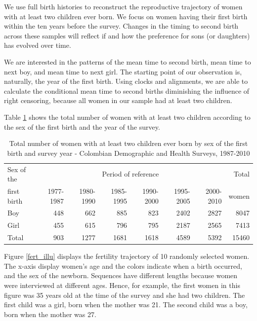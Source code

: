 \documentclass{article}
\begin{document}
We use full birth histories to reconstruct the reproductive trajectory of women with at least two children ever born. We focus on women having their first birth within the ten years before the survey. Changes in the timing to second birth across these samples will reflect if and how the preference for sons (or daughters) has evolved over time.

We are interested in the patterns of the mean time to second birth, mean time to next boy, and mean time to next girl. The starting point of our observation is, naturally, the year of the first birth. Using clocks and alignments, we are able to calculate the conditional mean time to second births diminishing the influence of right censoring, because all women in our sample had at least two children. 

Table \ref{tfert_01} shows the total number of women with at least two children according to the sex of the first birth and the year of the survey. 

\begin{table}[ht]
\centering
\begin{tabular}{lrrrrrrr}
  \hline
Sex of the  & \multicolumn{6}{c}{Period of reference} & Total \\
first birth & 1977-1987 & 1980-1990 & 1985-1995 & 1990-2000 & 1995-2005 & 2000-2010 & women \\ 
  \hline
Boy & 448 & 662 & 885 & 823 & 2402 & 2827 & 8047 \\ 
Girl & 455 & 615 & 796 & 795 & 2187 & 2565 & 7413 \\\hline 
Total & 903 & 1277 & 1681 & 1618 & 4589 & 5392 & 15460 \\ 
   \hline
\end{tabular}
\caption{Total number of women with at least two children ever born by sex of the first birth and survey year - Colombian Demographic and Health Surveys, 1987-2010}
\label{tfert_01}
\end{table}

Figure \ref{fert_illu} displays the fertility trajectory of 10 randomly selected women. The x-axis display women's age and the colors indicate when a birth occurred, and the sex of the newborn. Sequences have different lengths because women were interviewed at different ages. Hence, for example, the first women in this figure was 35 years old at the time of the survey and she had two children. The first child was a girl, born when the mother was 21. The second child was a boy, born when the mother was 27.
\end{document}
